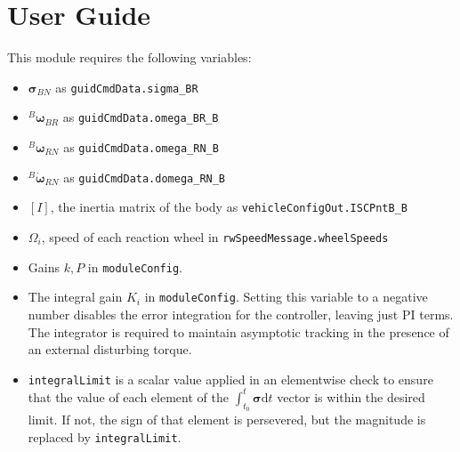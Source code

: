 \documentclass[]{BasiliskReportMemo}
\begin{document}
\section{User Guide}
This module requires the following variables:
\begin{itemize}
\item $\mathbf{\sigma}_{BN}$ as \verb|guidCmdData.sigma_BR|
\item $^B\mathbf{\omega}_{BR}$  as \verb|guidCmdData.omega_BR_B|
\item $^B\mathbf{\omega}_{RN}$ as \verb|guidCmdData.omega_RN_B|
\item $^B\dot{\mathbf{\omega}}_{RN}$ as \verb|guidCmdData.domega_RN_B|
\item $[I]$, the inertia matrix of the body as \verb|vehicleConfigOut.ISCPntB_B|
\item $\Omega_i$, speed of each reaction wheel in \verb|rwSpeedMessage.wheelSpeeds|
\item Gains $k,P$ in \verb|moduleConfig|. 
\item The integral gain $K_i$ in \verb|moduleConfig|. Setting this variable to a negative number disables the error integration for the controller, leaving just PI terms. The integrator is required to maintain asymptotic tracking in the presence of an external disturbing torque. 
\item \verb|integralLimit| is a scalar value applied in an elementwise check to ensure that the value of each element of the $\int_{t_{0}}^{t} \bm\sigma \text{d}t $ vector is within the desired limit. If not, the sign of that element is persevered, but the magnitude is replaced by \verb|integralLimit|.  
\end{itemize}



\end{document}
